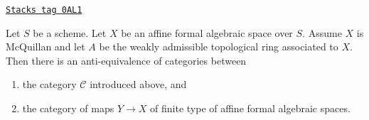 \begin{lemma}
\label{formal-spaces-lemma-category-affine-over}
\href{https://stacks.math.columbia.edu/tag/0AL1}{\texttt{Stacks tag 0AL1}}

Let $S$ be a scheme. Let $X$ be an affine formal algebraic space over $S$.
Assume $X$ is McQuillan and let $A$ be the weakly admissible topological
ring associated to $X$. Then there is an anti-equivalence of categories
between
\begin{enumerate}
\item the category $\mathcal{C}$ introduced above, and
\item the category of maps $Y \to X$ of finite type of
affine formal algebraic spaces.
\end{enumerate}
\end{lemma}

